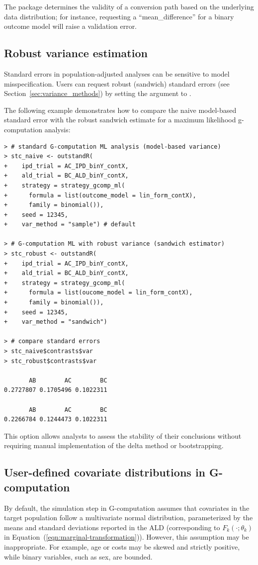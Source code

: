 \documentclass[article]{jss}
\begin{document}
The package determines the validity of a conversion path based on the underlying data distribution; for instance, requesting a ``mean\_difference'' for a binary outcome model will raise a validation error.

%
\subsection{Robust variance estimation}
Standard errors in population-adjusted analyses can be sensitive to model misspecification. Users can request robust (sandwich) standard errors (see Section~\ref{sec:variance_methods}) by setting the  argument to . 

The following example demonstrates how to compare the naive model-based standard error with the robust sandwich estimate for a maximum likelihood g-computation analysis:

\begin{verbatim}
> # standard G-computation ML analysis (model-based variance)
> stc_naive <- outstandR(
+    ipd_trial = AC_IPD_binY_contX,
+    ald_trial = BC_ALD_binY_contX,
+    strategy = strategy_gcomp_ml(
+      formula = list(outcome_model = lin_form_contX),
+      family = binomial()),
+    seed = 12345,
+    var_method = "sample") # default

> # G-computation ML with robust variance (sandwich estimator)
> stc_robust <- outstandR(
+    ipd_trial = AC_IPD_binY_contX,
+    ald_trial = BC_ALD_binY_contX,
+    strategy = strategy_gcomp_ml(
+      formula = list(oucome_model = lin_form_contX),
+      family = binomial()),
+    seed = 12345,
+    var_method = "sandwich")

> # compare standard errors
> stc_naive$contrasts$var
> stc_robust$contrasts$var

       AB        AC        BC 
0.2727807 0.1705496 0.1022311 

       AB        AC        BC 
0.2266784 0.1244473 0.1022311 
\end{verbatim}

This option allows analysts to assess the stability of their conclusions without requiring manual implementation of the delta method or bootstrapping.

%
\subsection{User-defined covariate distributions in G-computation}
By default, the simulation step in G-computation assumes that covariates in the target population follow a multivariate normal distribution, parameterized by the means and standard deviations reported in the ALD (corresponding to $F_k(\cdot; \theta_k)$ in Equation~(\ref{eqn:marginal-transformation})). However, this assumption may be inappropriate. For example, age or costs may be skewed and strictly positive, while binary variables, such as sex, are bounded.
\end{document}
